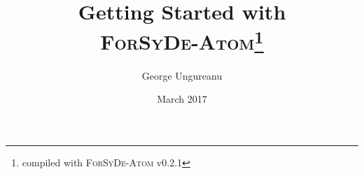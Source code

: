\documentclass{article}
\title{Getting Started with \\\textsc{ForSyDe-Atom}\thanks{compiled with \textsc{ForSyDe-Atom} v0.2.1}}
\author{George Ungureanu}
\date{March 2017}
\begin{document}
\maketitle

\begin{abstract}

\end{abstract}



\newpage
\tableofcontents
\newpage

























\printbibliography
\end{document}

